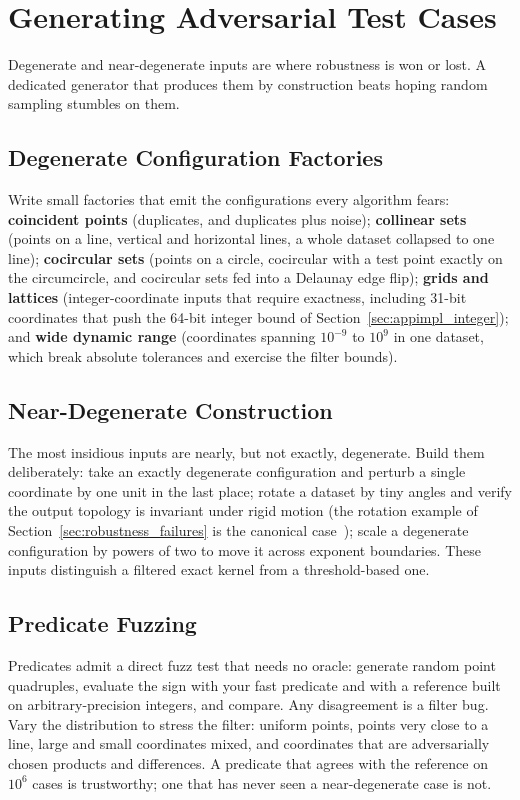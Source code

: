 \section{Generating Adversarial Test Cases}
\label{sec:app_impl_adversarial}
Degenerate and near-degenerate inputs are where robustness is won or lost.
A dedicated generator that produces them by construction beats hoping random
sampling stumbles on them.
\subsection{Degenerate Configuration Factories}
\label{sec:appimpl_degenerate_factories}
Write small factories that emit the configurations every algorithm fears:
\textbf{coincident points} (duplicates, and duplicates plus noise);
\textbf{collinear sets} (points on a line, vertical and horizontal lines, a
whole dataset collapsed to one line); \textbf{cocircular sets} (points on a
circle, cocircular with a test point exactly on the circumcircle, and
cocircular sets fed into a Delaunay edge flip); \textbf{grids and lattices}
(integer-coordinate inputs that require exactness, including 31-bit
coordinates that push the 64-bit integer bound of
Section~\ref{sec:appimpl_integer}); and \textbf{wide dynamic range}
(coordinates spanning $10^{-9}$ to $10^9$ in one dataset, which break
absolute tolerances and exercise the filter bounds).
\subsection{Near-Degenerate Construction}
\label{sec:appimpl_near_degenerate}
The most insidious inputs are nearly, but not exactly, degenerate. Build
them deliberately: take an exactly degenerate configuration and perturb a
single coordinate by one unit in the last place; rotate a dataset by tiny
angles and verify the output topology is invariant under rigid motion (the
rotation example of Section~\ref{sec:robustness_failures} is the canonical
case~\cite{kettner2008}); scale a degenerate configuration by powers of two
to move it across exponent boundaries. These inputs distinguish a filtered
exact kernel from a threshold-based one.
\subsection{Predicate Fuzzing}
\label{sec:appimpl_fuzzing}
Predicates admit a direct fuzz test that needs no oracle:
generate random point quadruples, evaluate the sign with your fast predicate
and with a reference built on arbitrary-precision integers, and compare. Any
disagreement is a filter bug. Vary the distribution to stress the filter:
uniform points, points very close to a line, large and small coordinates
mixed, and coordinates that are adversarially chosen products and
differences. A predicate that agrees with the reference on $10^6$ cases is
trustworthy; one that has never seen a near-degenerate case is not.
